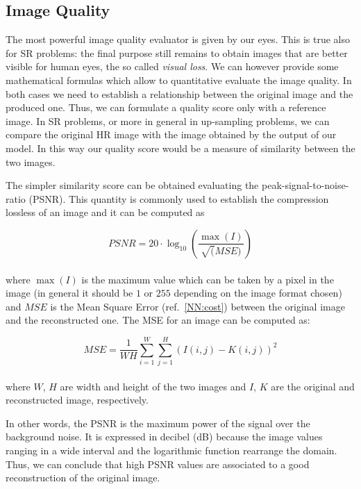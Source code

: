 \documentclass{standalone}
\begin{document}
\subsection[Image Quality]{Image Quality}\label{SR:quality}

The most powerful image quality evaluator is given by our eyes.
This is true also for SR problems: the final purpose still remains to obtain images that are better visible for human eyes, the so called \emph{visual loss}.
We can however provide some mathematical formulas which allow to quantitative evaluate the image quality.
In both cases we need to establish a relationship between the original image and the produced one.
Thus, we can formulate a quality score only with a reference image.
In SR problems, or more in general in up-sampling problems, we can compare the original HR image with the image obtained by the output of our model.
In this way our quality score would be a measure of similarity between the two images.

The simpler similarity score can be obtained evaluating the peak-signal-to-noise-ratio (PSNR).
This quantity is commonly used to establish the compression lossless of an image and it can be computed as

\begin{equation}
PSNR = 20 \cdot \log_{10}\left( \frac{\max(I)}{\sqrt(MSE)} \right)
\end{equation}
\\
where $\max(I)$ is the maximum value which can be taken by a pixel in the image (in general it should be $1$ or $255$ depending on the image format chosen) and $MSE$ is the Mean Square Error (ref.~\ref{NN:cost}) between the original image and the reconstructed one.
The MSE for an image can be computed as:

\begin{equation}
MSE = \frac{1}{WH} \sum_{i=1}^{W}\sum_{j=1}^{H} \left( I(i, j) - K(i, j) \right)^2
\end{equation}
\\
where $W$, $H$ are width and height of the two images and $I$, $K$ are the original and reconstructed image, respectively.

In other words, the PSNR is the maximum power of the signal over the background noise.
It is expressed in decibel (dB) because the image values ranging in a wide interval and the logarithmic function rearrange the domain.
Thus, we can conclude that high PSNR values are associated to a good reconstruction of the original image.
\end{document}
